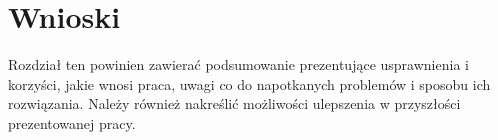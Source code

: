 \chapter{Wnioski}
\label{sec:chapter4}

Rozdział  ten powinien zawierać podsumowanie prezentujące usprawnienia i korzyści, jakie wnosi praca, uwagi co do napotkanych problemów i sposobu ich rozwiązania. Należy również nakreślić możliwości ulepszenia w przyszłości prezentowanej pracy.

